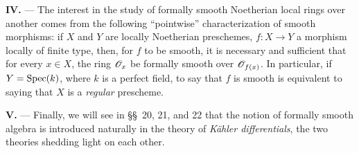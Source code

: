 \begin{env}[19.0.2]
\medskip\noindent\textbf{IV.} ---
The interest in the study of formally smooth Noetherian local rings over another comes from the following ``pointwise'' characterization of smooth morphisms:
if $X$ and $Y$ are locally Noetherian preschemes, $f:X\to Y$ a morphism locally of finite type, then, for $f$ to be smooth, it is necessary and sufficient that for every $x\in X$, the ring $\mathscr{O}_x$ be formally smooth over $\mathscr{O}_{f(x)}$.
In particular, if $Y=\operatorname{Spec}(k)$, where $k$ is a perfect field, to say that $f$ is smooth is equivalent to saying that $X$ is a \emph{regular} prescheme.

\medskip\noindent\textbf{V.} ---
Finally, we will see in \S\S~20, 21, and 22 that the notion of formally smooth algebra is introduced naturally in the theory of \emph{K\"ahler differentials}, the two theories shedding light on each other.
\end{env}

